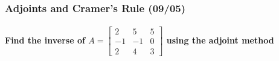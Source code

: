 \documentclass[
  letterpaper,
  DIV=11,
  numbers=noendperiod]{scrartcl}
\let\oldparagraph\paragraph
\renewcommand{\paragraph}[1]{\oldparagraph{#1}\mbox{}}
\begin{document}
\newpage{}

\subsubsection{Adjoints and Cramer's Rule
(09/05)}\label{adjoints-and-cramers-rule-0905}

\paragraph{\texorpdfstring{Find the inverse of
\(A=\begin{bmatrix}2 & 5 & 5 \\ -1 & -1 & 0 \\ 2 & 4 & 3\end{bmatrix}\)
using the adjoint
method}{Find the inverse of A=\textbackslash begin\{bmatrix\}2 \& 5 \& 5 \textbackslash\textbackslash{} -1 \& -1 \& 0 \textbackslash\textbackslash{} 2 \& 4 \& 3\textbackslash end\{bmatrix\} using the adjoint method}}\label{find-the-inverse-of-abeginbmatrix2-5-5--1--1-0-2-4-3endbmatrix-using-the-adjoint-method}
\end{document}
